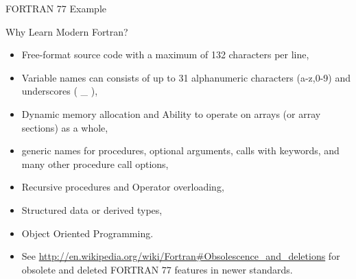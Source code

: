\documentclass[10pt,t]{beamer}
\begin{document}
\begin{frame}[fragile]{FORTRAN 77 Example}
  \begin{eblock}{SAXPY Code}
    Fortran},basicstyle=\fontsize{6}{5}\selectfont\ttfamily]{./Exercise/saxpy.f}
  \end{eblock}
\end{frame}

\begin{frame}{Why Learn Modern Fortran?}
  \begin{itemize}
    \item Free-format source code with a maximum of 132 characters per line,
    \item Variable names can consists of up to 31 alphanumeric characters (a-z,0-9) and underscores ( \_ ),
    \item Dynamic memory allocation and Ability to operate on arrays (or array sections) as a whole,
    \item generic names for procedures, optional arguments, calls with keywords, and many other procedure call options,
    \item Recursive procedures and Operator overloading,
    \item Structured data or derived types,
    \item Object Oriented Programming.
    \item See \url{http://en.wikipedia.org/wiki/Fortran\#Obsolescence_and_deletions} for obsolete and deleted FORTRAN 77 features in newer standards.
  \end{itemize}
\end{frame}
\end{document}
